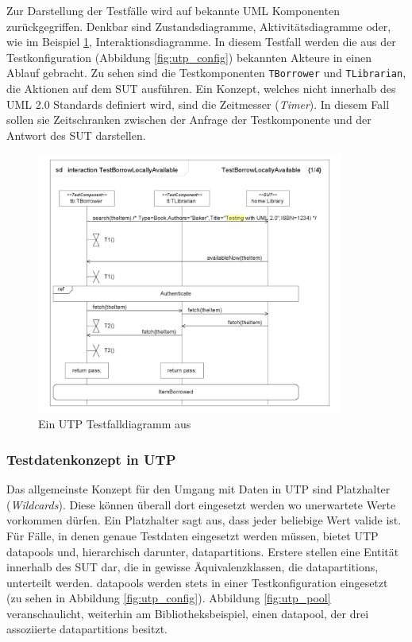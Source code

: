 Zur Darstellung der Testfälle wird auf bekannte \Gls{UML} Komponenten zurückgegriffen. Denkbar sind Zustandsdiagramme, Aktivitätsdiagramme oder, wie im Beispiel \ref{fig:utp_case}, Interaktionsdiagramme. In diesem Testfall werden die aus der Testkonfiguration (Abbildung \ref{fig:utp_config}) bekannten Akteure in einen Ablauf gebracht. Zu sehen sind die Testkomponenten \texttt{TBorrower} und \texttt{TLibrarian}, die Aktionen auf dem \Gls{SUT} ausführen. Ein Konzept, welches nicht innerhalb des \Gls{UML} 2.0 Standards definiert wird, sind die Zeitmesser (\textit{Timer}). In diesem Fall sollen sie Zeitschranken zwischen der Anfrage der Testkomponente und der Antwort des \Gls{SUT} darstellen.

\begin{figure}[h] 
  \centering
     \includegraphics[width=0.9\textwidth]{figures/utp_case.png}
  \caption{Ein UTP Testfalldiagramm aus  \cite{_model-driven_2007}}
  \label{fig:utp_case}
\end{figure}

\subsubsection{Testdatenkonzept in UTP}
\label{sec:utp_datapools}
Das allgemeinste Konzept für den Umgang mit Daten in \Gls{UTP} sind Platzhalter (\textit{Wildcards}). Diese können überall dort eingesetzt werden wo unerwartete Werte vorkommen dürfen. Ein Platzhalter sagt aus, dass jeder beliebige Wert valide ist.\\
Für Fälle, in denen genaue Testdaten eingesetzt werden müssen, bietet \Gls{UTP} \glspl{datapool} und, hierarchisch darunter, \glspl{datapartition}. Erstere stellen eine Entität innerhalb des \Gls{SUT} dar, die in gewisse Äquivalenzklassen, die \glspl{datapartition}, unterteilt werden. \glspl{datapool} werden stets in einer Testkonfiguration eingesetzt (zu sehen in Abbildung \ref{fig:utp_config}). Abbildung \ref{fig:utp_pool} veranschaulicht, weiterhin am Bibliotheksbeispiel, einen \Gls{datapool}, der drei assoziierte \glspl{datapartition} besitzt.

